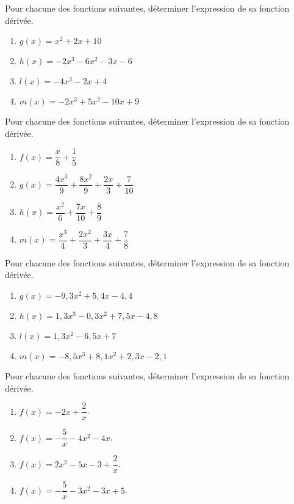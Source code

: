 \documentclass[11pt]{article}
\begin{document}
\begin{exercice}[1]
Pour chacune des fonctions suivantes, déterminer l'expression de sa fonction dérivée.
\begin{multicols}{2}
\begin{enumerate}[label=\arabic*)]
\item $g(x)=x^2+2x+10$
\item $h(x)=-2x^3-6x^2-3x-6$
\item $l(x)=-4x^2-2x+4$
\item $m(x)=-2x^3+5x^2-10x+9$
\end{enumerate}
\end{multicols}
\end{exercice}

\begin{exercice}[2]
Pour chacune des fonctions suivantes, déterminer l'expression de sa fonction dérivée.
\begin{multicols}{2}
\begin{enumerate}[label=\arabic*)]
\item $f(x)=\dfrac{x}{8}+\dfrac{1}{5}$
\item $g(x)=\dfrac{4x^3}{9}+\dfrac{8x^2}{9}+\dfrac{2x}{3}+\dfrac{7}{10}$
\item $h(x)=\dfrac{x^2}{6}+\dfrac{7x}{10}+\dfrac{8}{9}$
\item $m(x)=\dfrac{x^3}{4}+\dfrac{2x^2}{3}+\dfrac{3x}{4}+\dfrac{7}{8}$
\end{enumerate}
\end{multicols}
\end{exercice}

\begin{exercice}[2]
Pour chacune des fonctions suivantes, déterminer l'expression de sa fonction dérivée.
\begin{multicols}{2}
\begin{enumerate}[label=\arabic*)]
\item $g(x)=-9{,}3x^2+5{,}4x-4{,}4$
\item $h(x)=1{,}3x^3-0{,}3x^2+7{,}5x-4{,}8$
\item $l(x)=1{,}3x^2-6{,}5x+7$
\item $m(x)=-8{,}5x^3+8{,}1x^2+2{,}3x-2{,}1$
\end{enumerate}
\end{multicols}
\end{exercice}

\begin{exercice}[2]
Pour chacune des fonctions suivantes, déterminer l'expression de sa
fonction dérivée.
\begin{multicols}{2}
\begin{enumerate}[label=\arabic*)]
\item $f(x)=-2x+\dfrac{2}{x}$.
\item $f(x)=-\dfrac{5}{x}-4x^{2}-4x$.
\item $f(x)=2x^{2}-5x-3+\dfrac{2}{x}$.
\item $f(x)=-\dfrac{5}{x}-3x^{2}-3x+5$.
\end{enumerate}
\end{multicols}
\end{exercice}
\end{document}
